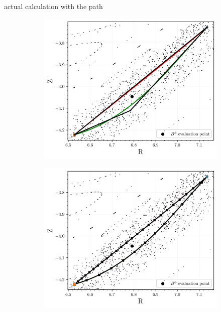 actual calculation with the path 

\begin{figure}[H]
    \centering
    \begin{subfigure}[t]{0.49\textwidth}
        \centering
        \includegraphics[width=\textwidth]{images/turnstile/verification_triangle.png}
        \caption{}
        \label{fig:}
    \end{subfigure}
    \hfill
    \begin{subfigure}[t]{0.49\textwidth}
        \centering
        \includegraphics[width=\textwidth]{images/turnstile/verification_loop.png}
        \caption{}
        \label{}
    \end{subfigure}
    \caption{}
    \label{}
\end{figure}

